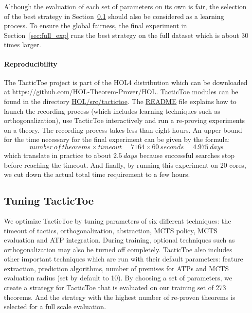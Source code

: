 \documentclass[runningheads,a4paper,draft]{svjour3}
\def\holfour{\textsf{HOL4}\xspace}
\def\tactictoe{\textsf{TacticToe}\xspace}
\begin{document}
Although the evaluation of each set of parameters on its own is fair,
the selection of the best strategy in Section~\ref{sec:tuning} should also be
considered as a learning process. To ensure the global fairness, the final
experiment in Section~\ref{sec:full_exp} runs the best strategy on the full
dataset which is about 30 times larger.

\paragraph{Reproducibility}
The \tactictoe project is part of the \holfour distribution 
which can be downloaded at \url{https://github.com/HOL-Theorem-Prover/HOL}.
\tactictoe modules can be found in the directory
\url{HOL/src/tactictoe}. The \url{README} file explains how to launch the 
recording 
process (which includes learning techniques such as orthogonalization),
use \tactictoe interactively and run a re-proving experiments on a theory. The 
recording process takes less than eight hours. An upper bound for 
the time necessary for the final experiment can be given by the formula:
\[\mathit{number\ of\ theorems} \times \mathit{timeout} = 7164 \times 60\ 
\mathit{seconds} = 
4.975\ \mathit{days}\] which translate in practice
to about $2.5\ \mathit{days}$ because successful searches stop before reaching 
the timeout. And finally, by running this experiment on 20 cores, we cut down 
the actual total time requirement to a few hours. 

\subsection{Tuning \tactictoe}\label{sec:tuning}
We optimize \tactictoe by tuning parameters of six different techniques:
the timeout of tactics, orthogonalization, abstraction, MCTS policy, MCTS
evaluation and ATP integration. During training, optional techniques such as
orthogonalization may also be turned off completely.
\tactictoe also includes other important techniques which are run with their
default parameters: feature extraction, prediction
algorithms, number of premises for ATPs and MCTS evaluation radius (set by default to
10).
By choosing a set of parameters, we create a strategy for
\tactictoe that is evaluated on our training set of 273 theorems. And the
strategy with the highest number of re-proven theorems is selected for
a full scale evaluation.
\end{document}
